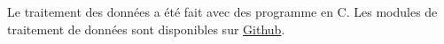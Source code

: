 
Le traitement des données a été fait avec des programme en C. Les modules de traitement de données sont disponibles sur \href{https://github.com/heiariilouchao/stage_M2.git}{Github}.